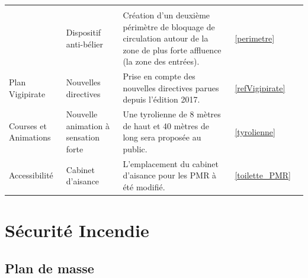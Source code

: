 \documentclass[hidelinks, paper=a4, fontsize=13pt]{report}
\begin{document}
\begin{tabular}{|m{}|m{}|m{}|m{}|m{}|}
\pageref{refProcedurePMA}\\
\cmidrule{2-5}
 & Dispositif anti-bélier & Création d'un deuxième périmètre de bloquage de circulation autour de la zone de plus forte affluence (la zone des entrées). & \ref{perimetre}&\pageref{perimetre}\\
\midrule
Plan Vigipirate & Nouvelles directives & Prise en compte des nouvelles directives parues depuis l'édition 2017. & \ref{refVigipirate}&\pageref{refVigipirate}\\
\midrule
Courses et Animations & Nouvelle animation à sensation forte & Une tyrolienne de 8 mètres de haut et 40 mètres de long sera proposée au public. & \ref{tyrolienne}&\pageref{tyrolienne}\\
\midrule
Accessibilité & Cabinet d'aisance & L'emplacement du cabinet d'aisance pour les PMR à été modifié. & \ref{toilette_PMR}&\pageref{toilette_PMR}\\
\bottomrule

\end{tabular}

\newpage


\chapter{ Sécurité Incendie}

\section{Plan de masse}
\end{document}
